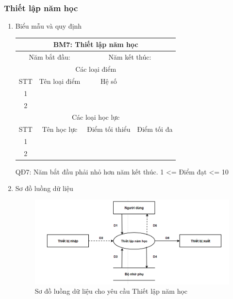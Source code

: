 \documentclass[a4paper]{article}
\begin{document}
		
		\subsubsection{Thiết lập năm học}	
\begin{enumerate}
\item Biểu mẫu và quy định

\begin{table}[H]
\centering
\renewcommand{\arraystretch}{1.5}
\setlength{\tabcolsep}{12pt}
\begin{tabular}{|c|c|c|c|}
\hline
\multicolumn{4}{|c|}{\textbf{BM7: Thiết lập năm học}} \\
\hline
\multicolumn{2}{|p{5cm}|}{Năm bắt đầu: \dotfill}  & \multicolumn{2}{|p{5cm}|}{Năm kết thúc: \dotfill}  \\
\hline
\multicolumn{4}{|c|}{Các loại điểm} \\
\hline
STT & Tên loại điểm & Hệ số & \\
\hline 
1 & & & \\
\hline
2 & & & \\
\hline
\multicolumn{4}{|c|}{Các loại học lực} \\
\hline
STT & Tên học lực & Điểm tối thiểu & Điểm tối đa \\ 
\hline
1 & & & \\
\hline
2 & & & \\
\hline

\end{tabular}
\end{table}

QĐ7: Năm bắt đầu phải nhỏ hơn năm kết thúc. 1 <= Điểm đạt <= 10


\item Sơ đồ luồng dữ liệu
\begin{figure}[H] 
    \centering
    \includegraphics[width=1\textwidth]{dfd7} %
    \caption{Sơ đồ luồng dữ liệu cho yêu cầu Thiết lập năm học}
\end{figure}


\end{enumerate}
\end{document}
